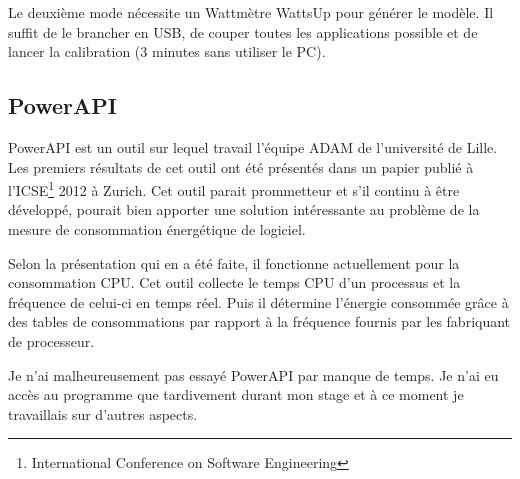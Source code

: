 \documentclass[a4paper, 11pt]{report}
\begin{document}
Le deuxième mode nécessite un Wattmètre WattsUp pour générer le modèle. Il suffit de le brancher en USB, de couper toutes les applications possible et de lancer la calibration (3 minutes sans utiliser le PC).

\subsection{PowerAPI}
PowerAPI est un outil sur lequel travail l'équipe ADAM de l'université de Lille. Les premiers résultats de cet outil ont été présentés dans un papier\cite{noureddine:hal-00681560} publié à l'ICSE\footnote{International Conference on Software Engineering} 2012 à Zurich. Cet outil parait prommetteur et s'il continu à être développé, pourait bien apporter une solution intéressante au problème de la mesure de consommation énergétique de logiciel.

Selon la présentation qui en a été faite, il fonctionne actuellement pour la consommation CPU. Cet outil collecte le temps CPU d'un processus et la fréquence de celui-ci en temps réel. Puis il détermine l'énergie consommée grâce à des tables de consommations par rapport à la fréquence fournis par les fabriquant de processeur.

Je n'ai malheureusement pas essayé PowerAPI par manque de temps. Je n'ai eu accès au programme que tardivement durant mon stage et à ce moment je travaillais sur d'autres aspects.

\end{document}
